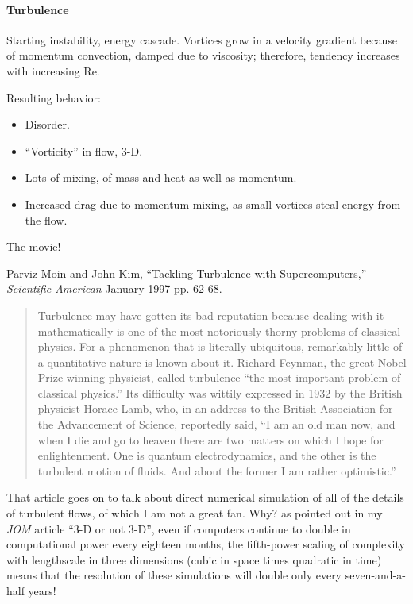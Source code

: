 \documentclass{report}
\begin{document}
\paragraph{Turbulence}

Starting instability, energy cascade.  Vortices grow in a velocity gradient
because of momentum convection, damped due to viscosity; therefore, tendency
increases with increasing Re.

Resulting behavior:
\begin{itemize}
\item Disorder.
\item ``Vorticity'' in flow, 3-D.
\item Lots of mixing, of mass and heat as well as momentum.
\item Increased drag due to momentum mixing, as small vortices steal energy
  from the flow.
\end{itemize}

The movie!

Parviz Moin and John Kim, ``Tackling Turbulence with Supercomputers,'' {\em
Scientific American} January 1997 pp. 62-68. %
\begin{quote}
  Turbulence may have gotten its bad reputation because dealing with it
  mathematically is one of the most notoriously thorny problems of classical
  physics.  For a phenomenon that is literally ubiquitous, remarkably little of
  a quantitative nature is known about it.  Richard Feynman, the great Nobel
  Prize-winning physicist, called turbulence ``the most important problem of
  classical physics.''  Its difficulty was wittily expressed in 1932 by the
  British physicist Horace Lamb, who, in an address to the British Association
  for the Advancement of Science, reportedly said, ``I am an old man now, and
  when I die and go to heaven there are two matters on which I hope for
  enlightenment.  One is quantum electrodynamics, and the other is the
  turbulent motion of fluids.  And about the former I am rather optimistic.''
\end{quote}

That article goes on to talk about direct numerical simulation of all of the
details of turbulent flows, of which I am not a great fan.  Why?  as pointed
out in my {\em JOM} article ``3-D or not 3-D'', even if computers continue to
double in computational power every eighteen months, the fifth-power scaling of
complexity with lengthscale in three dimensions (cubic in space times quadratic
in time) means that the resolution of these simulations will double only every
seven-and-a-half years!
\end{document}

